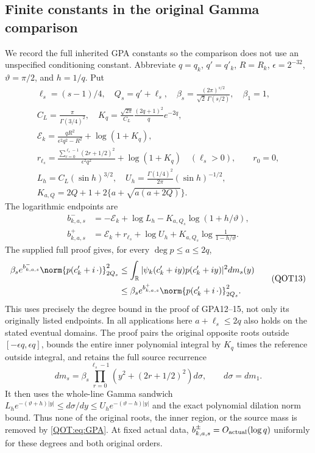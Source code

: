 \documentclass[11pt,a4paper]{article}
\providecommand{\R}{\mathbb R}
\begin{document}
\subsection{Finite constants in the original Gamma comparison}
We record the full inherited GPA constants so the comparison does not use an unspecified conditioning constant. Abbreviate $q=q_k$, $q'=q'_k$, $R=R_k$, $\epsilon=2^{-32}$, $\vartheta=\pi/2$, and $h=1/q$. Put
\begin{equation}
\begin{gathered}
 \ell_s=(s-1)/4,\quad Q_s=q'+\ell_s,\quad
 \beta_s=\frac{(2\pi)^{s/2}}{\sqrt2\,\Gamma(s/2)},\quad \beta_1=1,\\
 C_L=\frac\pi{\Gamma(3/4)^2},\quad
 K_q=\frac{\sqrt{2\pi}}{C_L}\frac{(2q+1)^2}{q}e^{-2q},\\
 \mathcal E_k=\frac{qR^2}{\epsilon^2q^2-R^2}+\log(1+K_q),\\
 r_{\ell_s}=\frac{\sum_{r=0}^{\ell_s-1}(2r+1/2)^2}{\epsilon^2q^2}
                 +\log(1+K_q)\quad(\ell_s>0),\qquad r_0=0,\\
 L_h=C_L(\sin h)^{3/2},\quad
 U_h=\frac{\Gamma(1/4)^2}{2\pi}(\sin h)^{-1/2},\\
 K_{a,Q}=2Q+1+2\{a+\sqrt{a(a+2Q)}\}.
\end{gathered}\label{QOT:eq:GPconst}
\tag{QOT11}
\end{equation}
The logarithmic endpoints are
\begin{equation}
\begin{split}
 b^-_{k,a,s}&=-\mathcal E_k+\log L_h-K_{a,Q_s}\log(1+h/\vartheta),\\
 b^+_{k,a,s}&=\mathcal E_k+r_{\ell_s}+\log U_h
                    +K_{a,Q_s}\log\frac1{1-h/\vartheta}.
\end{split}\label{QOT:eq:bconst}
\tag{QOT12}
\end{equation}
The supplied full proof gives, for every $\deg p\le a\le2q$,
\begin{equation}
\begin{split}
 \beta_s e^{b^-_{k,a,s}}
\norm{p(c'_k+i\,\cdot)}_{2Q_s}^2
 &\le \int_{\R}|\psi_k(c'_k+iy)p(c'_k+iy)|^2dm_s(y)\\
 &\le\beta_s e^{b^+_{k,a,s}}
\norm{p(c'_k+i\,\cdot)}_{2Q_s}^2.
\end{split}\label{QOT:eq:GPA}
\tag{QOT13}
\end{equation}
This uses precisely the degree bound in the proof of GPA12--15, not only its originally listed endpoints. In all applications here $a+\ell_s\le2q$ also holds on the stated eventual domains. The proof pairs the original opposite roots outside $[-\epsilon q,\epsilon q]$, bounds the entire inner polynomial integral by $K_q$ times the reference outside integral, and retains the full source recurrence
\[
 dm_s=\beta_s\prod_{r=0}^{\ell_s-1}(y^2+(2r+1/2)^2)d\sigma,
 \qquad d\sigma=dm_1.
\]
It then uses the whole-line Gamma sandwich $L_he^{-(\vartheta+h)|y|}\le d\sigma/dy\le U_he^{-(\vartheta-h)|y|}$ and the exact polynomial dilation norm bound. Thus none of the original roots, the inner region, or the source mass is removed by \eqref{QOT:eq:GPA}. At fixed actual data, $b^\pm_{k,a,s}=O_{\rm actual}(\log q)$ uniformly for these degrees and both original orders.
\end{document}
